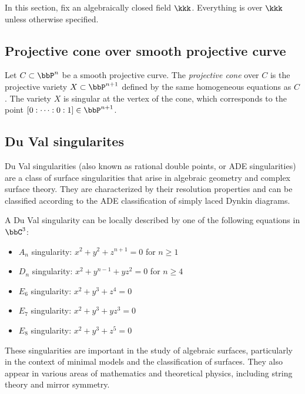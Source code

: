 In this section, fix an algebraically closed field \(\kkk\).
Everything is over \(\kkk\) unless otherwise specified.

\subsection{Projective cone over smooth projective curve}

    Let \(C \subset \bbP^n\) be a smooth projective curve.
    The \emph{projective cone} over \(C\) is the projective variety \(X \subset \bbP^{n+1}\) defined by the same homogeneous equations as \(C\).
    The variety \(X\) is singular at the vertex of the cone, which corresponds to the point \([0:\cdots:0:1]\in \bbP^{n+1}\).


\subsection{Du Val singularites}


    Du Val singularities (also known as rational double points, or ADE singularities) are a class of surface singularities that arise in algebraic geometry and complex surface theory.
    They are characterized by their resolution properties and can be classified according to the ADE classification of simply laced Dynkin diagrams.

    A Du Val singularity can be locally described by one of the following equations in \(\bbC^3\):

    \begin{itemize}
        \item \(A_n\) singularity: \(x^2 + y^2 + z^{n+1} = 0\) for \(n \geq 1\)
        \item \(D_n\) singularity: \(x^2 + y^{n-1} + yz^2 = 0\) for \(n \geq 4\)
        \item \(E_6\) singularity: \(x^2 + y^3 + z^4 = 0\)
        \item \(E_7\) singularity: \(x^2 + y^3 + yz^3 = 0\)
        \item \(E_8\) singularity: \(x^2 + y^3 + z^5 = 0\)
    \end{itemize}

    These singularities are important in the study of algebraic surfaces, particularly in the context of minimal models and the classification of surfaces.
    They also appear in various areas of mathematics and theoretical physics, including string theory and mirror symmetry.

    {\Large {}}

